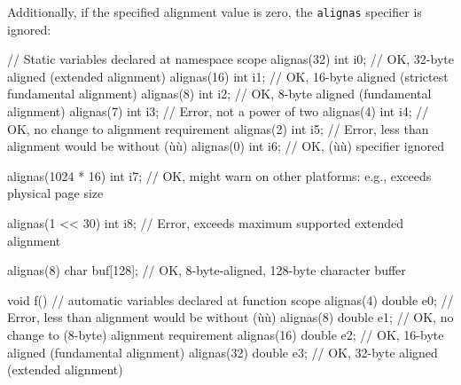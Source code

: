 \noindent Additionally, if the specified alignment value is zero, the
\lstinline!alignas! specifier is ignored:

%
%
%
%
\begin{emcppslisting}
// Static variables declared at namespace scope
alignas(32) int i0; // OK, 32-byte aligned (extended alignment)
alignas(16) int i1; // OK, 16-byte aligned (strictest fundamental alignment)
alignas(8)  int i2; // OK,  8-byte aligned (fundamental alignment)
alignas(7)  int i3; // Error, not a power of two
alignas(4)  int i4; // OK, no change to alignment requirement
alignas(2)  int i5; // Error, less than alignment would be without (ù{}ù)
alignas(0)  int i6; // OK, (ù{}ù) specifier ignored

alignas(1024 * 16) int i7;
    // OK, might warn on other platforms: e.g., exceeds physical page size

alignas(1 << 30) int i8;
    // Error, exceeds maximum supported extended alignment

alignas(8) char buf[128]; // OK, 8-byte-aligned, 128-byte character buffer

void f()
{
  // automatic variables declared at function scope
  alignas(4)  double e0; // Error, less than alignment would be without (ù{}ù)
  alignas(8)  double e1; // OK, no change to (8-byte) alignment requirement
  alignas(16) double e2; // OK, 16-byte aligned (fundamental alignment)
  alignas(32) double e3; // OK, 32-byte aligned (extended alignment)
}
\end{emcppslisting}



